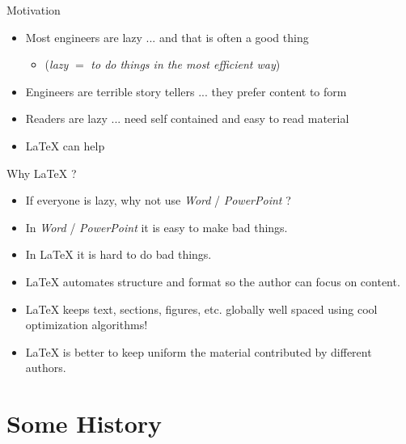\begin{frame}{Motivation}
	\begin{itemize}
  		\item Most engineers are lazy ... and that is often a good thing
  		\begin{itemize}
			\item (\textit{lazy} $=$ \textit{to do things in the most efficient way})
		\end{itemize}
  		\pause
  		\item Engineers are terrible story tellers ... they prefer content to form
  		\pause
  		\item Readers are lazy ... need self contained and easy to read material
  		\pause 
  		\item \LaTeX{} can help
  	\end{itemize}
\end{frame}

\begin{frame}{Why \LaTeX{} ?}
	\begin{itemize}
  		\item If everyone is lazy, why not use \textit{Word} / \textit{PowerPoint} ?
  		\pause
  		\item In \textit{Word} / \textit{PowerPoint} it is easy to make bad things.
  		\pause
  		\item In \LaTeX{} it is hard to do bad things.
  		\pause
  		\item \LaTeX{} automates structure and format so the author can focus on content.
  		\pause
  		\item \LaTeX{} keeps text, sections, figures, etc. globally well spaced using cool optimization algorithms!
  		\pause
  		\item \LaTeX{} is better to keep uniform the material contributed by different authors.
	\end{itemize}
\end{frame}

\section{Some History}

